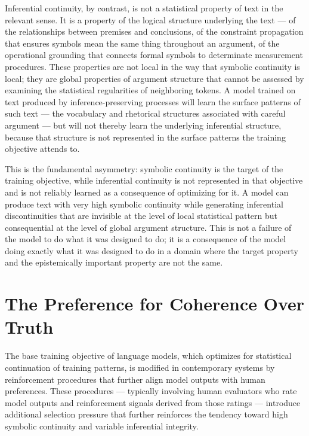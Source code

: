 \documentclass[12pt, openright, twoside]{book}
\begin{document}
Inferential continuity, by contrast, is not a statistical
property of text in the relevant sense. It is a property
of the logical structure underlying the text --- of the
relationships between premises and conclusions, of the
constraint propagation that ensures symbols mean the same
thing throughout an argument, of the operational grounding
that connects formal symbols to determinate measurement
procedures. These properties are not local in the way that
symbolic continuity is local; they are global properties
of argument structure that cannot be assessed by examining
the statistical regularities of neighboring tokens. A model
trained on text produced by inference-preserving processes
will learn the surface patterns of such text --- the
vocabulary and rhetorical structures associated with careful
argument --- but will not thereby learn the underlying
inferential structure, because that structure is not
represented in the surface patterns the training objective
attends to.

This is the fundamental asymmetry: symbolic continuity is
the target of the training objective, while inferential
continuity is not represented in that objective and is
not reliably learned as a consequence of optimizing for
it. A model can produce text with very high symbolic
continuity while generating inferential discontinuities
that are invisible at the level of local statistical
pattern but consequential at the level of global argument
structure. This is not a failure of the model to do what
it was designed to do; it is a consequence of the model
doing exactly what it was designed to do in a domain where
the target property and the epistemically important property
are not the same.

\section{The Preference for Coherence Over Truth}

The base training objective of language models, which
optimizes for statistical continuation of training
patterns, is modified in contemporary systems by
reinforcement procedures that further align model outputs
with human preferences. These procedures --- typically
involving human evaluators who rate model outputs and
reinforcement signals derived from those ratings ---
introduce additional selection pressure that further
reinforces the tendency toward high symbolic continuity
and variable inferential integrity.
\end{document}
